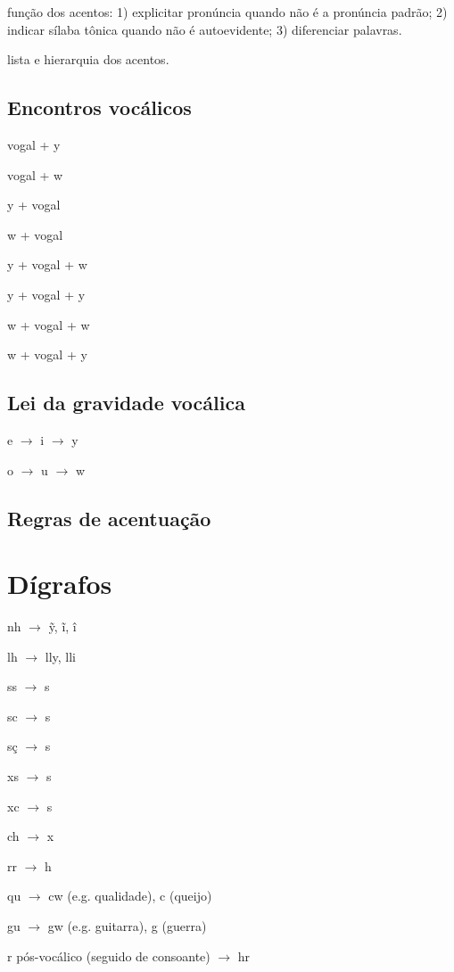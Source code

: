 \documentclass[12pt, a5paper, titlepage]{article}
\begin{document}
\begin{bilingualpages}
    \PtTableDiacritics

    função dos acentos: 1) explicitar pronúncia quando não é a pronúncia padrão; 2)
    indicar sílaba tônica quando não é autoevidente; 3) diferenciar palavras.

    lista e hierarquia dos acentos.

    \subsection{Encontros vocálicos}
    vogal + y

    vogal + w

    y + vogal

    w + vogal

    y + vogal + w

    y + vogal + y

    w + vogal + w

    w + vogal + y

    \subsection{Lei da gravidade vocálica}
    e $\rightarrow$ i $\rightarrow$ y

    o $\rightarrow$ u $\rightarrow$ w

    \subsection{Regras de acentuação}

    \section{Dígrafos}
    nh $\rightarrow$ \~y, ĩ, î

    lh $\rightarrow$ lly, lli

    ss $\rightarrow$ s

    sc $\rightarrow$ s

    sç $\rightarrow$ s

    xs $\rightarrow$ s

    xc $\rightarrow$ s

    ch $\rightarrow$ x

    rr $\rightarrow$ h

    qu $\rightarrow$ cw (e.g. qualidade), c (queijo)

    gu $\rightarrow$ gw (e.g. guitarra), g (guerra)

    r pós-vocálico (seguido de consoante) $\rightarrow$ hr


\end{bilingualpages}
\end{document}
